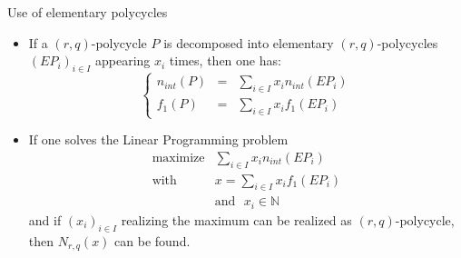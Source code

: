 \documentclass[%
pdf,
colorBG,
slideColor,
]{prosper}
\newcommand{\NN}{\ensuremath{\mathbb{N}}}
\begin{document}
\begin{slide}{Use of elementary polycycles}
\begin{itemize}
\item If a $(r,q)$-polycycle $P$ is decomposed into elementary $(r,q)$-polycycles $(EP_i)_{i\in I}$ appearing $x_i$ times, then one has:
\begin{equation*}
\left\lbrace\begin{array}{rcl}
n_{int}(P)&=&\sum_{i\in I} x_i n_{int}(EP_i)\\
f_{1}(P)&=&\sum_{i\in I} x_i f_{1}(EP_i)
\end{array}\right.
\end{equation*}
\item If one solves the Linear Programming problem 
\begin{equation*}
\begin{array}{rl}
\mbox{maximize}&\sum_{i\in I} x_i n_{int}(EP_i)\\
\mbox{with}&x=\sum_{i\in I} x_i f_{1}(EP_i)\\
           &\mbox{and~~}x_i\in \NN
\end{array}
\end{equation*}
and if $(x_i)_{i\in I}$ realizing the maximum can be realized as $(r,q)$-polycycle, then $N_{r,q}(x)$ can be found.
\end{itemize}
\end{slide}
\end{document}

